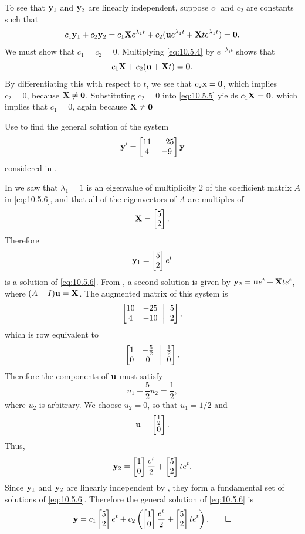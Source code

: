 To see that $\mathbf{y}_1$ and $\mathbf{y}_2$  are linearly independent,
suppose   $c_1$ and $c_2$ are constants such that
\begin{equation}\label{eq:10.5.4}
c_1\mathbf{y}_1+c_2\mathbf{y}_2=c_1\mathbf{X}e^{\lambda_1t}+c_2(\mathbf{u}e^{\lambda_1t} +\mathbf{X}te^{\lambda_1t})=\mathbf{0}.
\end{equation}
We must show that $c_1=c_2=0$.  Multiplying \eqref{eq:10.5.4}
by $e^{-\lambda_1t}$ shows that
\begin{equation}\label{eq:10.5.5}
c_1\mathbf{X}+c_2(\mathbf{u} +\mathbf{X}t)=\mathbf{0}.
\end{equation}
By differentiating this with respect to $t$, we see that $c_2\mathbf{x}=\mathbf{0}$, which implies $c_2=0$, because $\mathbf{X}\ne\mathbf{0}$.
Substituting  $c_2=0$ into \eqref{eq:10.5.5}  yields $c_1\mathbf{X}=\mathbf{0}$,
which implies that $c_1=0$, again because $\mathbf{X}\ne\mathbf{0}$

\begin{example}\label{example:10.5.2}
Use  to find the general solution of the system
\begin{equation}\label{eq:10.5.6}
\mathbf{y}'=\begin{bmatrix}11&-25\\4&-9\end{bmatrix}\mathbf{y}
\end{equation}
considered in .
\end{example}

\begin{solution}
In  we saw that $\lambda_1=1$ is an
eigenvalue of multiplicity $2$ of the coefficient matrix $A$ in
\eqref{eq:10.5.6}, and that all of the eigenvectors of $A$ are multiples of
\[
\mathbf{X}=\begin{bmatrix}5\\2\end{bmatrix}.
\]
Therefore
\[
\mathbf{y}_1=\begin{bmatrix}5\\2\end{bmatrix}e^t
\]
is a solution of \eqref{eq:10.5.6}. From , a second
solution is given by $\mathbf{y}_2=\mathbf{u}e^t+\mathbf{X}te^t$, where
$(A-I)\mathbf{u}=\mathbf{X}$. The augmented matrix of this system is
\[
\amatrix{10&-25\\4&-10}{5\\2},
\]
which is row equivalent to
\[
\amatrix{1&-\frac52\\0&0}{\frac12\\0}.
\]
Therefore the components of $\mathbf{u}$ must satisfy
\[
u_1-\frac{5}{2}u_2=\frac{1}{2},
\]
where  $u_2$ is arbitrary. We choose $u_2=0$, so that $u_1=1/2$ and
\[
\mathbf{u}=\begin{bmatrix}\frac{1}{2}\\0\end{bmatrix}.
\]
Thus,
\[
\mathbf{y}_2=\begin{bmatrix}1\\0\end{bmatrix}\frac{e^t}{2}+\begin{bmatrix}5\\2\end{bmatrix}te^t.
\]
Since $\mathbf{y}_1$ and $\mathbf{y}_2$ are linearly independent by
, they form a fundamental set of solutions of
\eqref{eq:10.5.6}. Therefore the general solution of \eqref{eq:10.5.6} is
\[
\mathbf{y}=c_1\begin{bmatrix}5\\2\end{bmatrix}e^t+c_2\left(\begin{bmatrix}1\\0\end{bmatrix}\frac{e^t}{2}+\begin{bmatrix}5\\2\end{bmatrix}te^t\right).\qedhere
\]
\end{solution}

